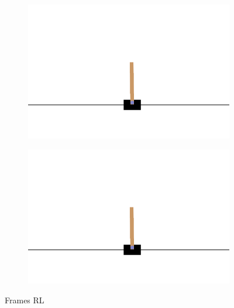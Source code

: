 \begin{figure}[H]
	\hfill
	\begin{subfigure}
		\centering
		\includegraphics[width=0.3\linewidth]{Images/frames/RL/11.png}
	\end{subfigure}
	\hfill
	\begin{subfigure}
		\centering
		\includegraphics[width=0.3\linewidth]{Images/frames/RL/12.png}
	\end{subfigure}
	\caption{Frames RL}
	\label{fig:framesRL}
\end{figure}

